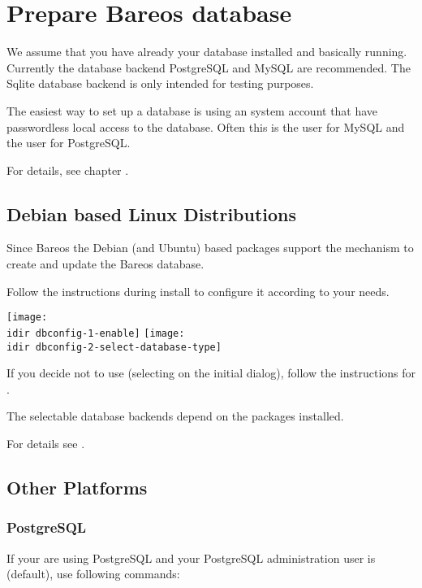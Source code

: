 \section{Prepare Bareos database}
    \label{sec:CreateDatabase}

We assume that you have already your database installed and basically running.
Currently the database backend PostgreSQL and MySQL are recommended. The Sqlite database backend is only intended for testing purposes.

The easiest way to set up a database is using an system account that have passwordless local access to the database. 
Often this is the user  for MySQL and the user  for PostgreSQL.

For details, see chapter .

\subsection{Debian based Linux Distributions}

Since Bareos  the Debian (and Ubuntu) based packages support the  mechanism to create and update the Bareos database.

Follow the instructions during install to configure it according to your needs.

\begin{center}
\texttt{[image: \\idir dbconfig-1-enable]}
\texttt{[image: \\idir dbconfig-2-select-database-type]}
\end{center}

If you decide not to use  (selecting  on the initial dialog), 
follow the instructions for .

The selectable database backends depend on the  packages installed.

For details see .

\subsection{Other Platforms}
    \label{sec:CreateDatabaseOtherDistributions}

\subsubsection{PostgreSQL}
If your are using PostgreSQL and your PostgreSQL administration user is  (default), use following commands:

